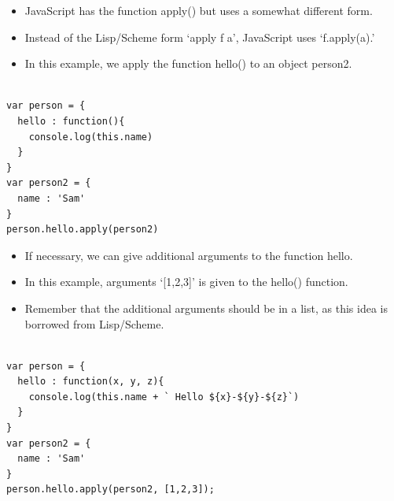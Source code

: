 \begin{frame}[fragile]{}

\begin{itemize}
	\item JavaScript has the function apply() but uses a somewhat different form.
	\item Instead of the Lisp/Scheme form `apply f a', JavaScript uses `f.apply(a).'
	\item In this example, we apply the function hello() to an object person2. 
\end{itemize}

\begin{Code}{}%
\begin{lstlisting}[firstnumber=1, label=glabels, xleftmargin=0pt, basicstyle=\scriptsize]% 

var person = {
  hello : function(){
    console.log(this.name)
  }
}
var person2 = {
  name : 'Sam'
}
person.hello.apply(person2)
\end{lstlisting}%
\end{Code}%
\end{frame}

\begin{frame}[fragile]{}

\begin{itemize}
	\item If necessary, we can give additional arguments to the function hello. 
	\item In this example, arguments `[1,2,3]' is given to the hello() function.
	\item Remember that the additional arguments should be in a list, as this idea is borrowed from Lisp/Scheme. 
\end{itemize}

\begin{Code}{}%
\begin{lstlisting}[firstnumber=1, label=glabels, xleftmargin=0pt, basicstyle=\scriptsize]% 

var person = {
  hello : function(x, y, z){
    console.log(this.name + ` Hello ${x}-${y}-${z}`)
  }
}
var person2 = {
  name : 'Sam'
}
person.hello.apply(person2, [1,2,3]);
\end{lstlisting}%
\end{Code}%

\end{frame}

